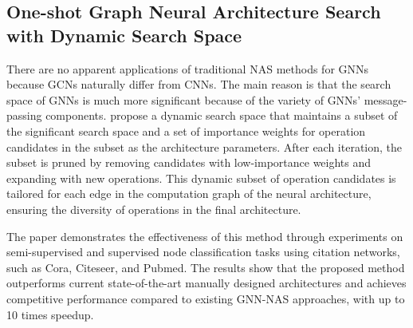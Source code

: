 \subsection{One-shot Graph Neural Architecture Search with Dynamic Search Space}

There are no apparent applications of traditional \gls{NAS} methods for \glspl{GNN} because \glspl{GCN} naturally differ from \glspl{CNN}. The main reason is that the search space of \glspl{GNN} is much more significant because of the variety of \glspl{GNN}' message-passing components. \cite{li2021one} propose a dynamic search space that maintains a subset of the significant search space and a set of importance weights for operation candidates in the subset as the architecture parameters. After each iteration, the subset is pruned by removing candidates with low-importance weights and expanding with new operations. This dynamic subset of operation candidates is tailored for each edge in the computation graph of the neural architecture, ensuring the diversity of operations in the final architecture. 

The paper demonstrates the effectiveness of this method through experiments on semi-supervised and supervised node classification tasks using citation networks, such as Cora, Citeseer, and Pubmed. The results show that the proposed method outperforms current state-of-the-art manually designed architectures and achieves competitive performance compared to existing \gls{GNN}-\gls{NAS} approaches, with up to 10 times speedup.